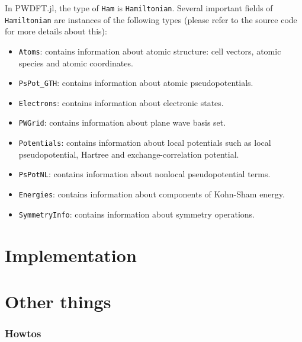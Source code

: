 \documentclass[a4paper,fleqn]{article}
\newcommand{\jlinline}[1]{\texttt{#1}}
\begin{document}
In \textsf{PWDFT.jl}, the type of \jlinline{Ham} is \jlinline{Hamiltonian}.
Several important fields of \jlinline{Hamiltonian} are instances of the following
types (please refer to the source code for more details about this):
\begin{itemize}
\item \jlinline{Atoms}: contains information about atomic structure: cell
vectors, atomic species and atomic coordinates.
\item \jlinline{PsPot_GTH}: contains information about atomic pseudopotentials.
\item \jlinline{Electrons}: contains information about electronic states.
\item \jlinline{PWGrid}: contains information about plane wave basis set.
\item \jlinline{Potentials}: contains information about local potentials such
as local pseudopotential, Hartree and exchange-correlation potential.
\item \jlinline{PsPotNL}: contains information about nonlocal pseudopotential
terms.
\item \jlinline{Energies}: contains information about components of Kohn-Sham
energy.
\item \jlinline{SymmetryInfo}: contains information about symmetry operations.
\end{itemize}

\newpage
\part{Implementation}



















\newpage
\part{Other things}

\appendix
\section{Howtos}
\end{document}

